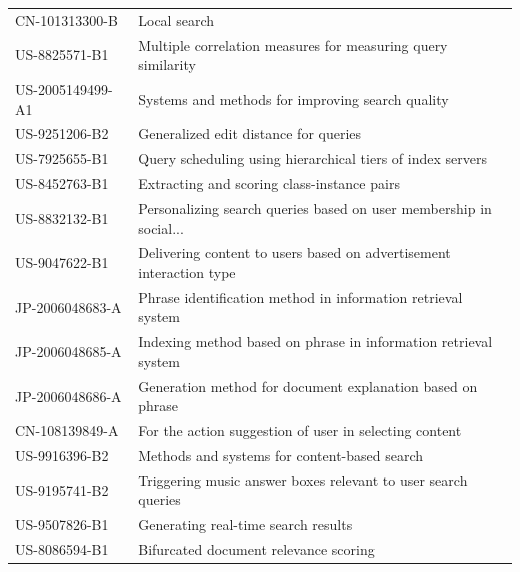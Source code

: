 \begin{table}[]
\begin{tabular}{ll}
CN-101313300-B   & Local search                                                                                                    \\
US-8825571-B1    & Multiple correlation measures for measuring query similarity                                                    \\
US-2005149499-A1 & Systems and methods for improving search quality                                                                \\
US-9251206-B2    & Generalized edit distance for queries                                                                           \\
US-7925655-B1    & Query scheduling using hierarchical tiers of index servers                                                      \\
US-8452763-B1    & Extracting and scoring class-instance pairs                                                                     \\
US-8832132-B1    & Personalizing search queries based on user membership in social...                             \\
US-9047622-B1    & Delivering content to users based on advertisement interaction type                                             \\
JP-2006048683-A  & Phrase identification method in information retrieval system                                                    \\
JP-2006048685-A  & Indexing method based on phrase in information retrieval system                                                 \\
JP-2006048686-A  & Generation method for document explanation based on phrase                                                      \\
CN-108139849-A   & For the action suggestion of user in selecting content                                                          \\
US-9916396-B2    & Methods and systems for content-based search                                                                    \\
US-9195741-B2    & Triggering music answer boxes relevant to user search queries                                                   \\
US-9507826-B1    & Generating real-time search results                                                                             \\
US-8086594-B1    & Bifurcated document relevance scoring                                                                           \\

\end{tabular}
\end{table}
